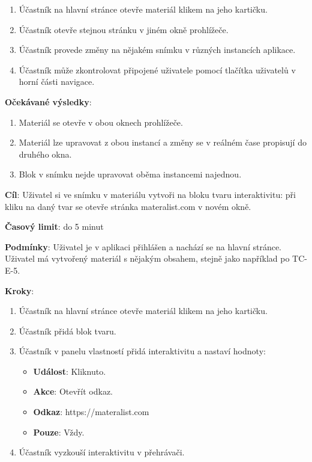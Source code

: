 \begin{enumerate}[leftmargin=1.4cm]
    \item Účastník na hlavní stránce otevře materiál klikem na jeho kartičku.
    \item Účastník otevře stejnou stránku v jiném okně prohlížeče.
    \item Účastník provede změny na nějakém snímku v různých instancích aplikace.
    \item Účastník může zkontrolovat připojené uživatele pomocí tlačítka uživatelů v horní části navigace.
\end{enumerate}

\textbf{Očekávané výsledky}:

\begin{enumerate}[leftmargin=1.4cm]
    \item Materiál se otevře v obou oknech prohlížeče.
    \item Materiál lze upravovat z obou instancí a změny se v reálném čase propisují do druhého okna.
    \item Blok v snímku nejde upravovat oběma instancemi najednou.
\end{enumerate}





\vspace{1em}

\textbf{Cíl}: Uživatel si ve snímku v materiálu vytvoři na bloku tvaru interaktivitu: při kliku na daný tvar se otevře stránka materalist.com v novém okně.

\textbf{Časový limit}: do 5 minut

\textbf{Podmínky}:  Uživatel je v aplikaci přihlášen a nachází se na hlavní stránce.  Uživatel má vytvořený materiál s nějakým obsahem, stejně jako například po TC-E-5.

\textbf{Kroky}:

\begin{enumerate}[leftmargin=1.4cm]
    \item Účastník na hlavní stránce otevře materiál klikem na jeho kartičku.
    \item Účastník přidá blok tvaru.
    \item Účastník v panelu vlastností přidá interaktivitu a nastaví hodnoty:
    \begin{itemize}
        \item \textbf{Událost}: Kliknuto.
        \item \textbf{Akce}: Otevřít odkaz.
        \item \textbf{Odkaz}: https://materalist.com
        \item \textbf{Pouze}: Vždy.
    \end{itemize}
    \item Účastník vyzkouší interaktivitu v přehrávači.
\end{enumerate}

